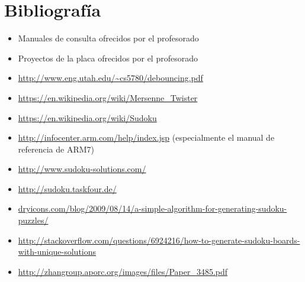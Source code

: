 \documentclass[12pt,letterpaper]{article}
\begin{document}
\clearpage
\section{Bibliografía}
\begin{itemize}
  \item Manuales de consulta ofrecidos por el profesorado
  \item Proyectos de la placa ofrecidos por el profesorado
  \item \url{http://www.eng.utah.edu/~cs5780/debouncing.pdf}
  \item \url{https://en.wikipedia.org/wiki/Mersenne_Twister}
  \item \url{https://en.wikipedia.org/wiki/Sudoku}
  \item \url{http://infocenter.arm.com/help/index.jsp} (especialmente
    el manual de referencia de ARM7)
  \item \url{http://www.sudoku-solutions.com/}
  \item \url{http://sudoku.taskfour.de/}
  \item
    \url{dryicons.com/blog/2009/08/14/a-simple-algorithm-for-generating-sudoku-puzzles/}
  \item
    \url{http://stackoverflow.com/questions/6924216/how-to-generate-sudoku-boards-with-unique-solutions}
  \item \url{http://zhangroup.aporc.org/images/files/Paper_3485.pdf}
\end{itemize}
\end{document}
